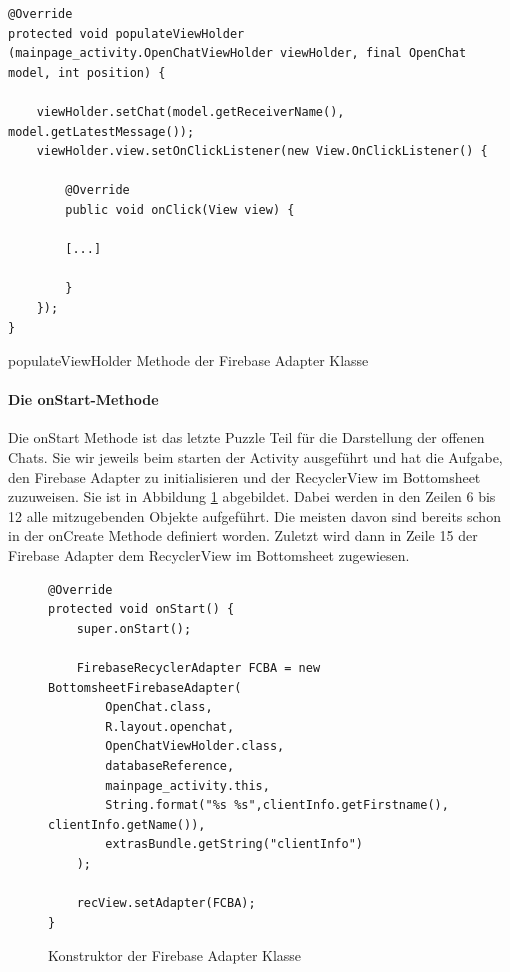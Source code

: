 \documentclass[a4paper,11pt]{report}
\newenvironment{code}{\captionsetup{type=figure}}{}
\begin{document}
\begin{code}
	\begin{center}
		\begin{verbatim}
@Override
protected void populateViewHolder (mainpage_activity.OpenChatViewHolder viewHolder, final OpenChat model, int position) {
	
	viewHolder.setChat(model.getReceiverName(), model.getLatestMessage());
	viewHolder.view.setOnClickListener(new View.OnClickListener() {
		
		@Override
		public void onClick(View view) {
		
		[...]
		
		}
	});
}
		\end{verbatim}
		\caption{populateViewHolder Methode der Firebase Adapter Klasse}\label{java:FirebaseAdapterPop}
	\end{center}
\end{code}

			\paragraph{Die onStart-Methode}
			Die onStart Methode ist das letzte Puzzle Teil für die Darstellung der offenen Chats. Sie wir jeweils beim starten der Activity ausgeführt und hat die Aufgabe, den Firebase Adapter zu initialisieren und der RecyclerView im Bottomsheet zuzuweisen. Sie ist in Abbildung \ref{java:onStart} abgebildet. Dabei werden in den Zeilen 6 bis 12 alle mitzugebenden Objekte aufgeführt. Die meisten davon sind bereits schon in der onCreate Methode definiert worden. Zuletzt wird dann in Zeile 15 der Firebase Adapter dem RecyclerView im Bottomsheet zugewiesen.
\begin{figure}
	\begin{center}
		\begin{verbatim}
@Override
protected void onStart() {
	super.onStart();

	FirebaseRecyclerAdapter FCBA = new BottomsheetFirebaseAdapter(
		OpenChat.class,
		R.layout.openchat,
		OpenChatViewHolder.class,
		databaseReference,
		mainpage_activity.this,
		String.format("%s %s",clientInfo.getFirstname(), clientInfo.getName()),
		extrasBundle.getString("clientInfo")
	);

	recView.setAdapter(FCBA);
}
		\end{verbatim}
		\caption{Konstruktor der Firebase Adapter Klasse}\label{java:onStart}
	\end{center}

\end{figure}			
\end{document}
